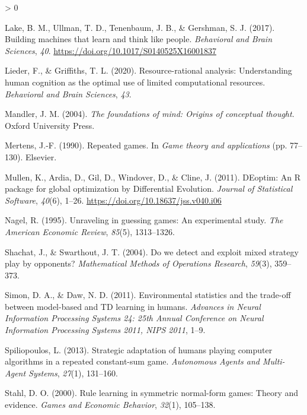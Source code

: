 \documentclass[
  english,
  man,floatsintext]{apa6}
\newlength{\cslhangindent}
\newenvironment{CSLReferences}[2] %
 {%
  \setlength{\parindent}{0pt}
  \ifodd #1 \everypar{\setlength{\hangindent}{\cslhangindent}}\ignorespaces\fi
  \ifnum #2 > 0
  \setlength{\parskip}{#2\baselineskip}
  \fi
 }%
 {}
\begin{document}
\begin{CSLReferences}{1}{0}
\leavevmode\hypertarget{ref-Lake2017}{}%
Lake, B. M., Ullman, T. D., Tenenbaum, J. B., \& Gershman, S. J. (2017). {Building machines that learn and think like people}. \emph{Behavioral and Brain Sciences}, \emph{40}. \url{https://doi.org/10.1017/S0140525X16001837}

\leavevmode\hypertarget{ref-lieder2020resource}{}%
Lieder, F., \& Griffiths, T. L. (2020). Resource-rational analysis: Understanding human cognition as the optimal use of limited computational resources. \emph{Behavioral and Brain Sciences}, \emph{43}.

\leavevmode\hypertarget{ref-mandler2004foundations}{}%
Mandler, J. M. (2004). \emph{The foundations of mind: Origins of conceptual thought}. Oxford University Press.

\leavevmode\hypertarget{ref-mertens1990repeated}{}%
Mertens, J.-F. (1990). {Repeated games}. In \emph{Game theory and applications} (pp. 77--130). Elsevier.

\leavevmode\hypertarget{ref-R-DEoptim}{}%
Mullen, K., Ardia, D., Gil, D., Windover, D., \& Cline, J. (2011). {DEoptim}: An {R} package for global optimization by {D}ifferential {E}volution. \emph{Journal of Statistical Software}, \emph{40}(6), 1--26. \url{https://doi.org/10.18637/jss.v040.i06}

\leavevmode\hypertarget{ref-nagel1995unraveling}{}%
Nagel, R. (1995). Unraveling in guessing games: An experimental study. \emph{The American Economic Review}, \emph{85}(5), 1313--1326.

\leavevmode\hypertarget{ref-shachat2004we}{}%
Shachat, J., \& Swarthout, J. T. (2004). {Do we detect and exploit mixed strategy play by opponents?} \emph{Mathematical Methods of Operations Research}, \emph{59}(3), 359--373.

\leavevmode\hypertarget{ref-Simon_Daw_11}{}%
Simon, D. A., \& Daw, N. D. (2011). {Environmental statistics and the trade-off between model-based and TD learning in humans}. \emph{Advances in Neural Information Processing Systems 24: 25th Annual Conference on Neural Information Processing Systems 2011, NIPS 2011}, 1--9.

\leavevmode\hypertarget{ref-spiliopoulos2013strategic}{}%
Spiliopoulos, L. (2013). {Strategic adaptation of humans playing computer algorithms in a repeated constant-sum game}. \emph{Autonomous Agents and Multi-Agent Systems}, \emph{27}(1), 131--160.

\leavevmode\hypertarget{ref-stahl2000rule}{}%
Stahl, D. O. (2000). Rule learning in symmetric normal-form games: Theory and evidence. \emph{Games and Economic Behavior}, \emph{32}(1), 105--138.


\end{CSLReferences}
\end{document}

